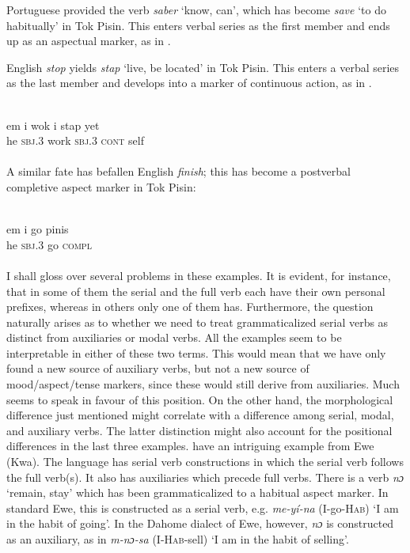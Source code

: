 \noindent Portuguese provided the verb \textit{saber} ‘know, can’, which has become \textit{save} ‘to do habitually’ in Tok Pisin. This enters verbal series as the first member and ends up as an aspectual marker, as in .

English \textit{stop} yields \textit{stap} ‘live, be located’ in Tok Pisin. This enters a verbal series as the last member and develops into a marker of continuous action, as in .

\ea\label{ex:E8}
\\
\gll em  i  wok  i  stap  yet\\
 he  \textsc{sbj}.3  work  \textsc{sbj}.3  \textsc{cont}  self\\
\\
\z
\noindent A similar fate has befallen English \textit{finish}; this has become a postverbal completive aspect marker in Tok Pisin:

\ea\label{ex:}
 \\
\gll em  i  go  pinis\\
he  \textsc{sbj}.3  go  \textsc{compl}\\
\\
\z
\noindent I shall gloss over several problems in these examples. It is evident, for instance, that in some of them the serial and the full verb each have their own personal prefixes, whereas in others only one of them has. Furthermore, the question naturally arises as to whether we need to treat grammaticalized serial verbs as distinct from auxiliaries or modal verbs. All the examples seem to be interpretable in either of these two terms. This would mean that we have only found a new source of auxiliary verbs, but not a new source of mood/aspect/tense markers, since these would still derive from auxiliaries. Much seems to speak in favour of this position. On the other hand, the morphological difference just mentioned might correlate with a difference among serial, modal, and auxiliary verbs. The latter distinction might also account for the positional differences in the last three examples. \citet[128]{HeineEtAl1984} have an intriguing example from Ewe (Kwa). The language has serial verb constructions in which the serial verb follows the full verb(s). It also has auxiliaries which precede full verbs. There is a verb \textit{nɔ} ‘remain, stay’ which has been grammaticalized to a habitual aspect marker. In standard Ewe, this is constructed as a serial verb, e.g. \textit{me-yí-na} (I-go-\textsc{Hab}) ‘I am in the habit of going’. In the Dahome dialect of Ewe, however, \textit{nɔ} is constructed as an auxiliary, as in \textit{m-nɔ-sa} (I-\textsc{Hab}{}-sell) ‘I am in the habit of selling’.

